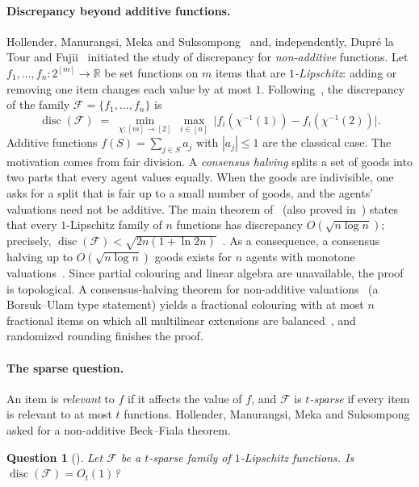 \documentclass[11pt,letterpaper]{article}
\newtheorem{question}[theorem]{Question}
\theoremstyle{definition}
\newcommand{\R}{\mathbb{R}}
\newcommand{\cF}{\mathcal{F}}
\DeclareMathOperator{\disc}{disc}
\begin{document}
\paragraph{Discrepancy beyond additive functions.}
Hollender, Manurangsi, Meka and Suksompong~\cite{HMMS25} and, independently, Dupr\'e la Tour and
Fujii~\cite{DF25} initiated the study of discrepancy for \emph{non-additive} functions. Let
$f_1,\dots,f_n\colon 2^{[m]}\to\R$ be set functions on $m$ items that are \emph{$1$-Lipschitz}:
adding or removing one item changes each value by at most $1$. Following~\cite{HMMS25}, the
discrepancy of the family $\cF=\{f_1,\dots,f_n\}$ is
\[
  \disc(\cF)\;=\;\min_{\chi\colon[m]\to[2]}\ \max_{i\in[n]}\ \bigl|f_i(\chi^{-1}(1))-f_i(\chi^{-1}(2))\bigr| .
\]
Additive functions $f(S)=\sum_{j\in S}a_j$ with $|a_j|\le1$ are the classical case. The
motivation comes from fair division. A \emph{consensus halving} splits a set of goods into two
parts that every agent values equally. When the goods are indivisible, one asks for a split that
is fair up to a small number of goods, and the agents' valuations need not be additive. The main
theorem of~\cite{HMMS25} (also proved in~\cite{DF25}) states that every $1$-Lipschitz family of
$n$ functions has discrepancy $O(\sqrt{n\log n})$; precisely, $\disc(\cF)<\sqrt{2n(1+\ln
2n)}$~\cite[Theorem~8]{HMMS25}. As a consequence, a consensus halving up to $O(\sqrt{n\log n})$
goods exists for $n$ agents with monotone valuations~\cite[Theorem~3]{HMMS25}. Since partial
colouring and linear algebra are unavailable, the proof is topological. A consensus-halving
theorem for non-additive valuations~\cite{SS03} (a Borsuk--Ulam type statement) yields a
fractional colouring with at most $n$ fractional items on which all multilinear extensions are
balanced~\cite[Lemma~9]{HMMS25}, and randomized rounding finishes the proof.

\paragraph{The sparse question.}
An item is \emph{relevant} to $f$ if it affects the value of $f$, and $\cF$ is
\emph{$t$-sparse} if every item is relevant to at most $t$ functions. Hollender, Manurangsi, Meka
and Suksompong asked for a non-additive Beck--Fiala theorem.

\begin{question}[{\cite[Question~14]{HMMS25}}]\label{q:14}
Let $\cF$ be a $t$-sparse family of $1$-Lipschitz functions. Is $\disc(\cF)=O_t(1)$?
\end{question}
\end{document}
